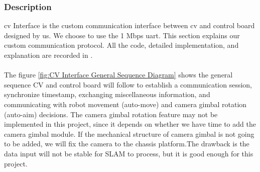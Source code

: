 \documentclass[12pt]{article}
\begin{document}
        \subsubsection{Description}
            \acrshort{cv} Interface is the custom communication interface between \acrshort{cv} and control board designed by us. We choose to use the 1 Mbps \acrshort{uart}. This section explains our custom communication protocol. All the code, detailed implementation, and explanation are recorded in \cite{CvInterfaceGit2023}.\\\\
            The figure \ref{fig:CV Interface General Sequence Diagram} shows the general sequence CV and control board will follow to establish a communication session, synchronize timestamp, exchanging miscellaneous information, and communicating with robot movement (auto-move) and camera gimbal rotation (auto-aim) decisions. The camera gimbal rotation feature may not be implemented in this project, since it depends on whether we have time to add the camera gimbal module. If the mechanical structure of camera gimbal is not going to be added, we will fix the camera to the chassis platform.The drawback is the data input will not be stable for SLAM to process, but it is good enough for this project.\\\\
            
\end{document}
